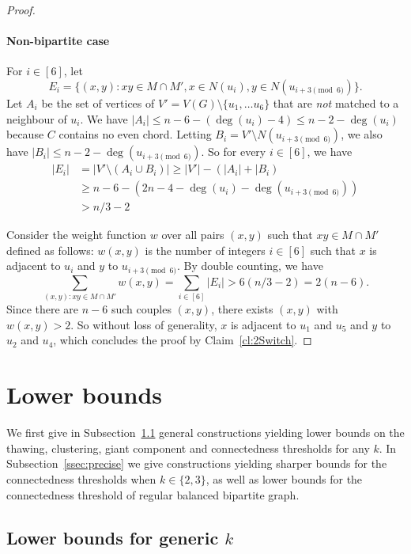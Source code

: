 \documentclass[11pt,a4paper]{article}
\theoremstyle{definition}
\begin{document}
\begin{proof}
  \paragraph{Non-bipartite case}
  For $i \in [6]$, let
  \[E_i = \{(x,y) \colon xy \in M \cap M', x \in N(u_i), y \in N(u_{i+3 \pmod
    6})\}.\] Let $A_i$ be the set of vertices of
  $V' = V(G) \setminus \{u_1, \dots u_6\}$ that are \emph{not} matched to a
  neighbour of $u_i$. We have $|A_i| \le n-6 - (\deg(u_i) -4) \le n-2 - \deg(u_i)$ because $C$
  contains no even chord. Letting
  $B_i = V' \setminus N(u_{i+3 \pmod 6})$, we also have $|B_i| \le n-2 - \deg(u_{i+3\pmod 6})$. So for every $i \in [6]$, we have
  \begin{align*}
    |E_i| &= |V' \setminus (A_i \cup B_i)|
     \ge |V'| - (|A_i|+|B_i)\\
    & \ge n-6 - (2n- 4 - \deg(u_i) - \deg(u_{i+3 \pmod 6})) \\
    & > n/3 -2
  \end{align*}
  
  Consider the weight function $w$ over all pairs $(x,y)$ such that
  $xy \in M \cap M'$ defined as follows: $w(x,y)$ is the number of integers $i \in [6]$
  such that $x$ is adjacent to $u_i$ and $y$ to $u_{i +3 \pmod 6}$. By double counting, we have
  $$\sum_{(x,y) \colon xy \in M \cap M'} w(x,y) = \sum_{i \in [6]} |E_i| >
  6(n/3-2)= 2(n-6).$$ Since there are $n-6$ such couples $(x,y)$, there exists $(x,y)$
  with $w(x,y) > 2$. So without loss of generality, $x$ is adjacent to $u_1$ and
  $u_5$ and $y$ to $u_2$ and $u_4$, which concludes the proof by
  Claim~\ref{cl:2Switch}.
\end{proof}

\section{Lower bounds}\label{sec:lower}

We first give in Subsection~\ref{ssec:generic} general constructions yielding lower bounds on the
thawing, clustering, giant component and connectedness thresholds for any
$k$. In Subsection~\ref{ssec:precise} we give constructions yielding sharper bounds for
the connectedness thresholds when $k \in \{2,3\}$, as well as lower bounds for
the connectedness threshold of regular balanced bipartite graph.

\subsection{Lower bounds for generic $k$}\label{ssec:generic}
\end{document}

